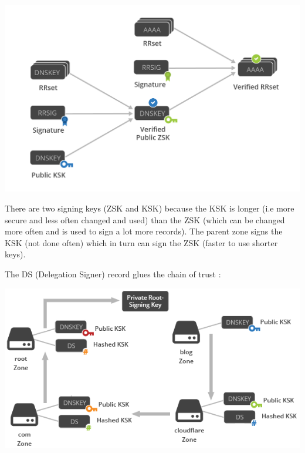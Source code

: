 \documentclass[english, leagacyboxes, nologo]{latex4ei/latex4ei_sheet}
\begin{document}
{   \includegraphics[width=\columnwidth]{img/DNSSECzone.png}

   There are two signing keys (ZSK and KSK) because the KSK is longer (i.e more secure and less often changed and used) than the ZSK (which can be changed more often and is used to sign a lot more records). The parent zone signs the KSK (not done often) which in turn can sign the ZSK (faster to use shorter keys).

   The DS (Delegation Signer) record glues the chain of trust :

   \includegraphics[width=\columnwidth]{img/DNSSECchain.png}
  }
\end{document}
